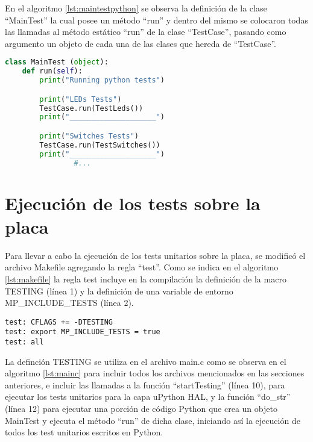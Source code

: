 En el algoritmo \ref{lst:maintestpython} se observa la definición de la clase “MainTest” la cual posee un método “run” y dentro del mismo se colocaron todas las llamadas al método estático “run” de la clase “TestCase”, pasando como argumento un objeto de cada una de las clases que hereda de “TestCase”.

\begin{lstlisting}[label={lst:maintestpython},caption=Clase MainTest desde donde se ejecutan todos los tests Python., language={python}]
class MainTest (object):
    def run(self):
        print("Running python tests")

        print("LEDs Tests")
        TestCase.run(TestLeds())
        print("____________________")

        print("Switches Tests")
        TestCase.run(TestSwitches())
        print("____________________")
				#...
\end{lstlisting}
 

\section{Ejecución de los tests sobre la placa}
\label{sec:testUnitariosPlaca}

Para llevar a cabo la ejecución de los tests unitarios sobre la placa, se modificó el archivo Makefile agregando la regla "`test"'. Como se indica en el algoritmo \ref{lst:makefile} la regla test incluye en la compilación la definición de la macro TESTING (línea 1) y la definición de una variable de entorno MP\_INCLUDE\_TESTS (línea 2).

\begin{lstlisting}[label={lst:makefile},caption=Regla test en Makefile.]
test: CFLAGS += -DTESTING
test: export MP_INCLUDE_TESTS = true
test: all 
\end{lstlisting}

La definción TESTING se utiliza en el archivo main.c como se observa en el algoritmo \ref{lst:mainc} para incluir todos los archivos mencionados en las secciones anteriores, e incluir las llamadas a la función “startTesting” (línea 10), para ejecutar los tests unitarios para la capa uPython HAL, y la función “do\_str” (línea 12) para ejecutar una porción de código Python que crea un objeto MainTest y ejecuta el método “run” de dicha clase, iniciando así la ejecución de todos los test unitarios escritos en Python.


